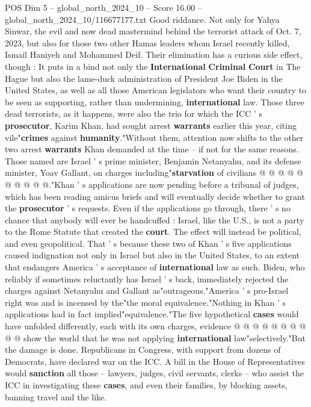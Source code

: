 \begin{textsample}{POS Dim 5 – global\_north\_2024\_10 – Score 16.00 – global\_north\_2024\_10/116677177.txt}  \label{ex:f5_pos_403}
Good riddance.
Not only for Yahya Sinwar, the evil and now dead mastermind behind the terrorist attack of Oct. 7, 2023, but also for those two other Hamas leaders whom Israel recently killed, Ismail Haniyeh and Mohammed Deif.
Their elimination has a curious side effect, though : It puts in a bind not only the \textbf{International} \textbf{Criminal} \textbf{Court} in The Hague but also the lame-duck administration of President Joe Biden in the United States, as well as all those American legislators who want their country to be seen as supporting, rather than undermining, \textbf{international} law.
Those three dead terrorists, as it happens, were also the trio for which the ICC ' s \textbf{prosecutor}, Karim Khan, had sought arrest \textbf{warrants} earlier this year, citing vile"\textbf{crimes} against \textbf{humanity}."Without them, attention now shifts to the other two arrest \textbf{warrants} Khan demanded at the time -- if not for the same reasons.
Those named are Israel ' s prime minister, Benjamin Netanyahu, and its defense minister, Yoav Gallant, on charges including"\textbf{starvation} of civilians @ @ @ @ @ @ @ @ @ @."Khan ' s applications are now pending before a tribunal of judges, which has been reading amicus briefs and will eventually decide whether to grant the \textbf{prosecutor} ' s requests.
Even if the applications go through, there ' s no chance that anybody will ever be handcuffed : Israel, like the U.S., is not a party to the Rome Statute that created the \textbf{court}.
The effect will instead be political, and even geopolitical.
That ' s because these two of Khan ' s five applications caused indignation not only in Israel but also in the United States, to an extent that endangers America ' s acceptance of \textbf{international} law as such.
Biden, who reliably if sometimes reluctantly has Israel ' s back, immediately rejected the charges against Netanyahu and Gallant as"outrageous."America ' s pro-Israel right was and is incensed by the"the moral equivalence."Nothing in Khan ' s applications had in fact implied"equivalence."The five hypothetical \textbf{cases} would have unfolded differently, each with its own charges, evidence @ @ @ @ @ @ @ @ @ @ show the world that he was not applying \textbf{international} law"selectively."But the damage is done.
Republicans in Congress, with support from dozens of Democrats, have declared war on the ICC.
A bill in the House of Representatives would \textbf{sanction} all those -- lawyers, judges, civil servants, clerks -- who assist the ICC in investigating these \textbf{cases}, and even their families, by blocking assets, banning travel and the like.

\end{textsample}

